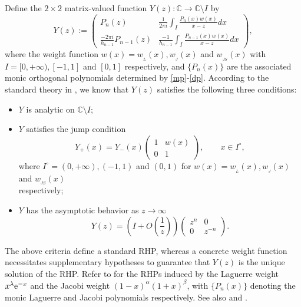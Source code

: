 \documentclass[12pt,a4paper]{article}    %
\newcommand{\e}{{\rm e}}
\numberwithin{equation}{section}
\begin{document}
Define the $2\times2$ matrix-valued function $Y(z):\mathbb{C} \rightarrow \mathbb{C} \setminus I$ by \begin{equation}\label{defY}
	Y(z) := \begin{pmatrix}
		P_n(z) & \frac{1}{2\pi i} \displaystyle\int_{I}\frac{P_n(x)w(x)}{x-z} dx \\
		\frac{-2\pi i}{h_{n-1}} P_{n-1}(z) & \frac{-1}{h_{n-1}}\displaystyle\int_{I}\frac{P_{n-1}(x)w(x)}{x-z}dx \end{pmatrix},
\end{equation}
where the weight function $w(x)=w_{_L}(x),w_{_J}(x)$ and $w_{_{JS}}(x)$ with $I=[0,+\infty),[-1,1]$ and $[0,1]$ respectively, and $\{P_n(x)\}$ are the associated monic orthogonal polynomials determined by \eqref{mp}-\eqref{dp}.
According to the standard theory in \cite{FIK}, we know that $Y(z)$ satisfies the following three conditions:	
\begin{itemize}
	\item [(i)]$Y$ is analytic on
	$\mathbb{C} \setminus I$;
	\item[(ii)] $Y$ satisfies the jump condition
	\[Y_+(x)=Y_-(x)\left( \begin{array}{cc}
		1 & w(x) \\
		0 & 1
	\end{array} \right),\qquad x\in I^{\circ},\]
where $I^{\circ}=(0,+\infty),(-1,1)$ and $(0,1)$ for $w(x)=w_{_L}(x),w_{_J}(x)$ and $w_{_{JS}}(x)$\\ respectively;
	\item[(iii)] $Y$ has the asymptotic behavior as $z\rightarrow \infty$
	$$Y(z)=\left( I+O\left( \frac{1}{z}\right) \right) \left( \begin{array}{cc}
		z^n & 0 \\
		0 & z^{-n}
	\end{array} \right).$$
\end{itemize}
The above criteria define a standard RHP, whereas a concrete weight function necessitates supplementary hypotheses to guarantee that $Y(z)$ is the unique solution of the RHP. Refer to \cite[Sections 22.4-22.5]{Ismail} for the RHPs induced by the Laguerre weight $x^{\lambda}\e^{-x}$ and the Jacobi weight $(1-x)^{\alpha}(1+x)^{\beta}$, with $\{P_n(x)\}$ denoting the monic Laguerre and Jacobi polynomials respectively. See also \cite[Section 3.2]{Deift} and \cite{ChenIts2010,WuXu21, WangFan}.
	
\end{document}
